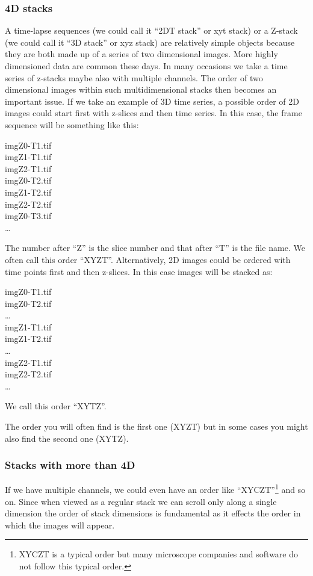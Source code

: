 \subsubsection{4D stacks}

A time-lapse sequences (we could call it ``2DT stack'' or xyt stack) or a Z-stack (we could call it ``3D stack'' or xyz stack) are relatively simple objects because they are both made up of a series of two dimensional images. More highly dimensioned data are common these days. In many occasions we take a time series of z-stacks maybe also with multiple channels. The order of two dimensional images within such multidimensional stacks then becomes an important issue. If we take an example of 3D time series, a possible order of 2D images could start first with z-slices and then time series. In this case, the frame sequence will be something like this:

imgZ0-T1.tif\\
imgZ1-T1.tif\\
imgZ2-T1.tif\\
imgZ0-T2.tif\\
imgZ1-T2.tif\\
imgZ2-T2.tif\\
imgZ0-T3.tif\\
\ldots

The number after ``Z'' is the slice number and that after ``T'' is the file name. We often call this order ``XYZT''. Alternatively, 2D images could be ordered with time points first and then z-slices. In this case images will be stacked as:

imgZ0-T1.tif\\
imgZ0-T2.tif\\
\ldots\\
imgZ1-T1.tif\\
imgZ1-T2.tif\\
\ldots\\
imgZ2-T1.tif\\
imgZ2-T2.tif\\
\ldots

We call this order ``XYTZ''. 

The order you will often find is the first one (XYZT) but in some
cases you might also find the second one (XYTZ). 

\subsubsection{Stacks with more than 4D}

If we have multiple channels, we could even have an order like ``XYCZT''\footnote{XYCZT is a typical order but many microscope companies and software do not follow this typical order.} and so on. Since when viewed as a regular stack we can scroll only along a single dimension the order of stack dimensions is fundamental as it effects the order in which the images will appear. 

